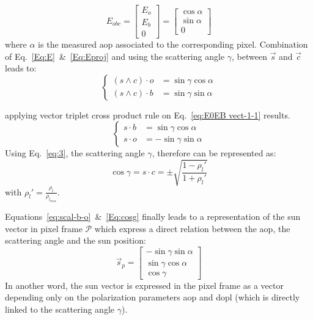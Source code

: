 \begin{equation}
E_{obc}=\left[\begin{array}{l}
E_{o}\\
E_{b}\\
0
\end{array}\right]=\left[\begin{array}{l}
\cos\alpha\\
\sin\alpha\\
0
\end{array}\right]
\label{Eq:Eproj}
\end{equation}
\noindent where $\alpha$ is the measured \gls{aop} associated to the corresponding pixel.
Combination of Eq.~\ref{Eq:E}~\&~\ref{Eq:Eproj} and using the
scattering angle $\gamma$, between $\vec{s}$ and $\vec{c}$ leads to:
\begin{equation}
  \begin{cases}
(s\wedge c)\cdot o & =\sin\gamma\cos\alpha\\
(s\wedge c)\cdot b & =\sin\gamma\sin\alpha
\end{cases}
\label{eq:E0EB vect-1-1}
\end{equation}

\noindent applying vector triplet cross product rule on Eq.~\ref{eq:E0EB
  vect-1-1} results.
\begin{equation}
\begin{cases}
s\cdot b & =\sin\gamma\cos\alpha\\
s\cdot o & =-\sin\gamma\sin\alpha
\end{cases}
\label{eq:scal-b-o}
\end{equation}
Using Eq.~\ref{eq:3}, the scattering angle $\gamma$, therefore can be
represented as:
\begin{equation}
\cos\gamma=s\cdot c=\pm\sqrt{\frac{1-\rho_{l}'}{1+\rho_{l}'}}
\label{Eq:cosg}
\end{equation}
\noindent with $\rho_{l}'=\frac{\rho_{l}}{\rho_{l_{max}}}.$ \\
\vspace{0.4mm}

Equations~\ref{eq:scal-b-o}~\&~\ref{Eq:cosg} finally leads to a representation of the sun vector
in pixel frame $\mathcal{P}$ which express a direct relation between the
\gls{aop}, the scattering angle and the sun position:
\begin{equation}
  \label{eq:sunp}
  \vec{s}_{p} =
    \begin{bmatrix}
    -\sin\gamma \sin\alpha\\
    \sin\gamma \cos\alpha\\
    \cos\gamma
  \end{bmatrix}
\end{equation}
In another word, the sun vector is expressed in the pixel frame as a vector depending only on the polarization parameters \gls{aop} and \gls{dopl} (which is directly linked to the scattering angle $\gamma$).

